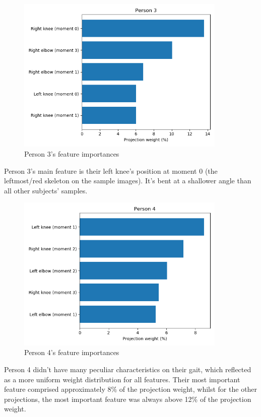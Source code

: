 \documentclass{bmvc2k}
\begin{document}
\begin{figure}[H]
   \begin{center}
      \includegraphics[width=10cm]{figures/person3Imp.png}
      \caption{Person 3's feature importances}
   \end{center}
\end{figure}
Person 3's main feature is their left knee's position at moment 0 (the leftmost/red skeleton on the sample images). It's bent at a shallower angle than all other subjects' samples.

\begin{figure}[H]
   \begin{center}
      \includegraphics[width=10cm]{figures/person4Imp.png}
      \caption{Person 4's feature importances}
   \end{center}
\end{figure}
Person 4 didn't have many peculiar characteristics on their gait, which reflected as a more uniform weight distribution for all features. Their most important feature comprised approximately 8\% of the projection weight, whilst for the other projections, the most important feature was always above 12\% of the projection weight.


\end{document}
